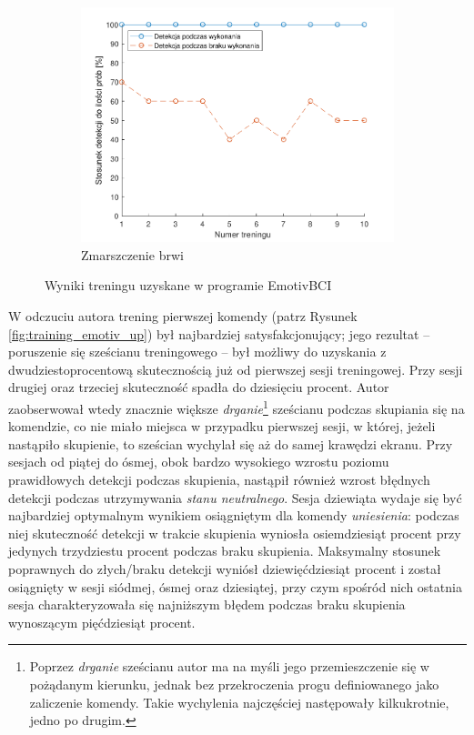 \documentclass[skorowidz,skroty]{dyplomWEZUT}
\begin{document}
{\begin{figure}[htbp]
        \medskip
        \hspace*{\fill}\begin{subfigure}{0.49\textwidth}
        \includegraphics[width=\linewidth]{graphic/frown}
        \caption{Zmarszczenie brwi\label{fig:training_emotiv_frown}}
        \end{subfigure}\hspace*{\fill}
        
        \caption{Wyniki treningu uzyskane w programie EmotivBCI\label{fig:training_emotiv}}
    \end{figure}
}

W odczuciu autora trening pierwszej komendy (patrz Rysunek \vref{fig:training_emotiv_up}) był najbardziej satysfakcjonujący; jego rezultat -- poruszenie się sześcianu treningowego -- był możliwy do uzyskania z dwudziestoprocentową skutecznością już od pierwszej sesji treningowej. Przy sesji drugiej oraz trzeciej skuteczność spadła do dziesięciu procent. Autor zaobserwował wtedy znacznie większe \textit{drganie}\footnote{Poprzez \textit{drganie} sześcianu autor ma na myśli jego przemieszczenie się w pożądanym kierunku, jednak bez przekroczenia progu definiowanego jako zaliczenie komendy. Takie wychylenia najczęściej następowały kilkukrotnie, jedno po drugim.} sześcianu podczas skupiania się na komendzie, co nie miało miejsca w przypadku pierwszej sesji, w której, jeżeli nastąpiło skupienie, to sześcian wychylał się aż do samej krawędzi ekranu. Przy sesjach od piątej do ósmej, obok bardzo wysokiego wzrostu poziomu prawidłowych detekcji podczas skupienia, nastąpił również wzrost błędnych detekcji podczas utrzymywania \textit{stanu neutralnego}. Sesja dziewiąta wydaje się być najbardziej optymalnym wynikiem osiągniętym dla komendy \textit{uniesienia}: podczas niej skuteczność detekcji w trakcie skupienia wyniosła osiemdziesiąt procent przy jedynych trzydziestu procent podczas braku skupienia. Maksymalny stosunek poprawnych do złych/braku detekcji wyniósł dziewięćdziesiąt procent i został osiągnięty w sesji siódmej, ósmej oraz dziesiątej, przy czym spośród nich ostatnia sesja charakteryzowała się najniższym błędem podczas braku skupienia wynoszącym pięćdziesiąt procent.
\end{document}
